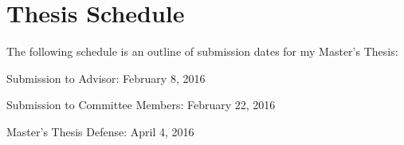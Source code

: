 \section{Thesis Schedule}
The following schedule is an outline of submission dates for my Master's Thesis:

Submission to Advisor: February 8, 2016

Submission to Committee Members: February 22, 2016

Master's Thesis Defense: April 4, 2016
